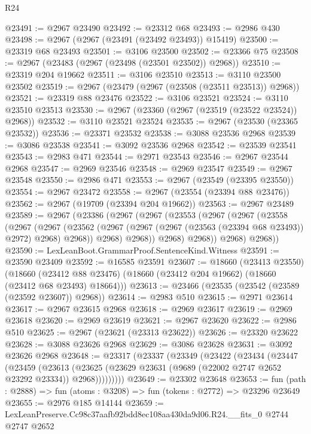 \begin{lexlean}{R24}
\begin{coremodule}
@23491 := @2967 @23490
@23492 := @23312 @68
@23493 := @2986 @430
@23498 := @2967 (@2967 (@23491 (@23492 @23493)) @15419)
@23500 := @23319 @68 @23493
@23501 := @3106 @23500
@23502 := @23366 @75
@23508 := @2967 (@23483 (@2967 (@23498 (@23501 @23502)) @2968))
@23510 := @23319 @204 @19662
@23511 := @3106 @23510
@23513 := @3110 @23500 @23502
@23519 := @2967 (@23479 (@2967 (@23508 (@23511 @23513)) @2968))
@23521 := @23319 @88 @23476
@23522 := @3106 @23521
@23524 := @3110 @23510 @23513
@23530 := @2967 (@23360 (@2967 (@23519 (@23522 @23524)) @2968))
@23532 := @3110 @23521 @23524
@23535 := @2967 (@23530 (@23365 @23532))
@23536 := @23371 @23532
@23538 := @3088 @23536 @2968
@23539 := @3086 @23538
@23541 := @3092 @23536 @2968
@23542 := @23539 @23541
@23543 := @2983 @471
@23544 := @2971 @23543
@23546 := @2967 @23544 @2968
@23547 := @2969 @23546
@23548 := @2969 @23547
@23549 := @2967 @23548
@23550 := @2986 @471
@23553 := @2967 (@23549 (@23395 @23550))
@23554 := @2967 @23472
@23558 := @2967 (@23554 (@23394 @88 @23476))
@23562 := @2967 (@19709 (@23394 @204 @19662))
@23563 := @2967 @23489
@23589 := @2967
    (@23386
      (@2967
        (@2967
          (@23553
            (@2967
              (@2967
                (@23558
                  (@2967
                    (@2967
                      (@23562
                        (@2967 (@2967 (@2967 (@23563 (@23394 @68 @23493)) @2972) @2968) @2968))
                      @2968)
                    @2968))
                @2968)
              @2968))
          @2968)
        @2968))
@23590 := LexLeanBoot.GrammarProof.SentenceKind.Witness
@23591 := @23590 @23409
@23592 := @16585 @23591
@23607 := @18660
    (@23413 @23550)
    (@18660 (@23412 @88 @23476) (@18660 (@23412 @204 @19662) (@18660 (@23412 @68 @23493) @18664)))
@23613 := @23466 (@23535 (@23542 (@23589 (@23592 @23607)) @2968))
@23614 := @2983 @510
@23615 := @2971 @23614
@23617 := @2967 @23615 @2968
@23618 := @2969 @23617
@23619 := @2969 @23618
@23620 := @2969 @23619
@23621 := @2967 @23620
@23622 := @2986 @510
@23625 := @2967 (@23621 (@23313 @23622))
@23626 := @23320 @23622
@23628 := @3088 @23626 @2968
@23629 := @3086 @23628
@23631 := @3092 @23626 @2968
@23648 := @23317
    (@23337
      (@23349
        (@23422
          (@23434
            (@23447
              (@23459
                (@23613
                  (@23625 (@23629 @23631 (@9689 (@22002 @2747 @2652 @23292 @23334)) @2968)))))))))
@23649 := @23302 @23648
@23653 := fun (path : @2888) => fun (atoms : @3208) => fun (tokens : @2772) => @23296 @23649
@23655 := @2976 @185 @14144
@23659 := LexLeanPreserve.Cc98c37aafb92bdd8ec108aa430da9d06.R24.__fits_0 @2744 @2747 @2652

\end{coremodule}
\end{lexlean}
